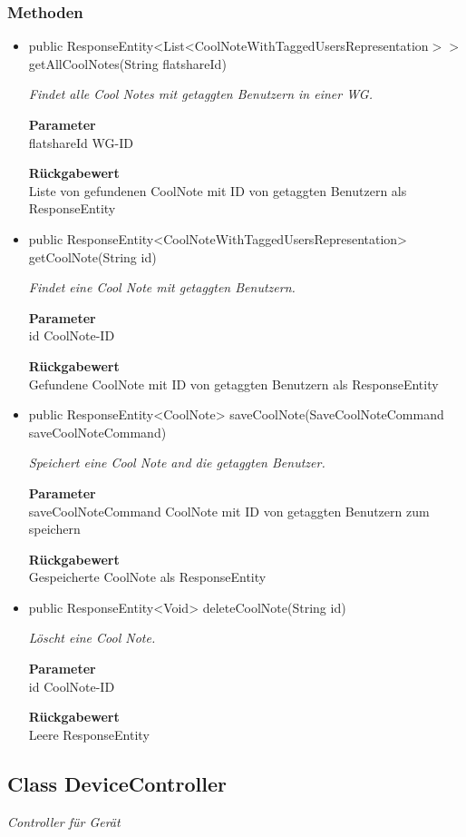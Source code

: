 \documentclass[a4paper]{scrreprt}
\begin{document}
    \subsubsection{Methoden}
    \begin{itemize}
    	\item{public ResponseEntity<List<CoolNoteWithTaggedUsersRepresentation$>>$ getAllCoolNotes(String flatshareId)}
    	
    	\textit{Findet alle Cool Notes mit getaggten Benutzern in einer WG.}
    	
    	\textbf{Parameter} \\
    	flatshareId WG-ID
    	
    	\textbf{Rückgabewert} \\
    	Liste von gefundenen CoolNote mit ID von getaggten Benutzern als ResponseEntity        \item{public ResponseEntity<CoolNoteWithTaggedUsersRepresentation> getCoolNote(String id)}
    	
    	\textit{Findet eine Cool Note mit getaggten Benutzern.}
    	
    	\textbf{Parameter} \\
    	id CoolNote-ID
    	
    	\textbf{Rückgabewert} \\
    	Gefundene CoolNote mit ID von getaggten Benutzern als ResponseEntity        \item{public ResponseEntity<CoolNote> saveCoolNote(SaveCoolNoteCommand saveCoolNoteCommand)}
    	
    	\textit{Speichert eine Cool Note and die getaggten Benutzer.}
    	
    	\textbf{Parameter} \\
    	saveCoolNoteCommand CoolNote mit ID von getaggten Benutzern zum speichern
    	
    	\textbf{Rückgabewert} \\
    	Gespeicherte CoolNote als ResponseEntity        \item{public ResponseEntity<Void> deleteCoolNote(String id)}
    	
    	\textit{Löscht eine Cool Note.}
    	
    	\textbf{Parameter} \\
    	id CoolNote-ID
    	
    	\textbf{Rückgabewert} \\
    	Leere ResponseEntity
    \end{itemize}
    \subsection{Class DeviceController}
    \textit{Controller für Gerät}
\end{document}
